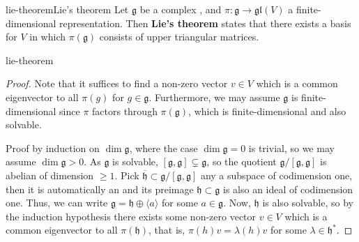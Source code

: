\begin{topic}{lie-theorem}{Lie's theorem}
    Let $\mathfrak{g}$ be a  complex , and $\pi : \mathfrak{g} \to \mathfrak{gl}(V)$ a finite-dimensional representation. Then \textbf{Lie's theorem} states that there exists a basis for $V$ in which $\pi(\mathfrak{g})$ consists of upper triangular matrices.
\end{topic}

\begin{example}{lie-theorem}
    \begin{proof}
        Note that it suffices to find a non-zero vector $v \in V$ which is a common eigenvector to all $\pi(g)$ for $g \in \mathfrak{g}$. Furthermore, we may assume $\mathfrak{g}$ is finite-dimensional since $\pi$ factors through $\pi(\mathfrak{g})$, which is finite-dimensional and also solvable.
        
        Proof by induction on $\dim \mathfrak{g}$, where the case $\dim \mathfrak{g} = 0$ is trivial, so we may assume $\dim \mathfrak{g} > 0$. As $\mathfrak{g}$ is solvable, $[\mathfrak{g}, \mathfrak{g}] \subsetneq \mathfrak{g}$, so the quotient $\mathfrak{g} / [\mathfrak{g}, \mathfrak{g}]$ is abelian of dimension $\ge 1$. Pick $\overline{\mathfrak{h}} \subset \mathfrak{g} / [\mathfrak{g}, \mathfrak{g}]$ any a subspace of codimension one, then it is automatically an  and its preimage $\mathfrak{h} \subset \mathfrak{g}$ is also an ideal of codimension one. Thus, we can write $\mathfrak{g} = \mathfrak{h} \oplus \langle a \rangle$ for some $a \in \mathfrak{g}$. Now, $\mathfrak{h}$ is also solvable, so by the induction hypothesis there exists some non-zero vector $v \in V$ which is a common eigenvector to all $\pi(\mathfrak{h})$, that is, $\pi(h) v = \lambda(h) v$ for some $\lambda \in \mathfrak{h}^*$.
        

\end{proof}
\end{example}
